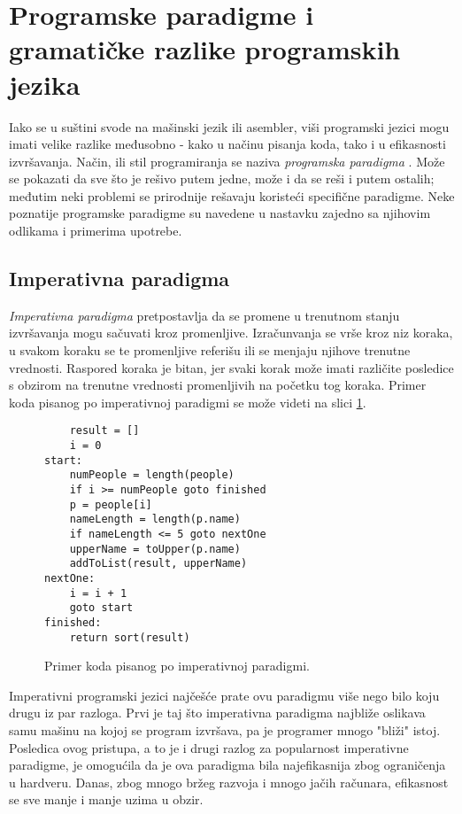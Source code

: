 \section{Programske paradigme i gramatičke razlike programskih jezika}
\label{sec:Paradigms}

Iako se u suštini svode na mašinski jezik ili asembler, viši programski jezici mogu imati velike razlike međusobno - kako u načinu pisanja koda, tako i u efikasnosti izvršavanja. Način, ili stil programiranja se naziva \emph{programska paradigma} \cite{ProgrammingParadigms}. Može se pokazati da sve što je rešivo putem jedne, može i da se reši i putem ostalih; međutim neki problemi se prirodnije rešavaju koristeći specifične paradigme. Neke poznatije programske paradigme su navedene u nastavku zajedno sa njihovim odlikama i primerima upotrebe.

\subsection{Imperativna paradigma}
\label{subsec:ParadigmImperative}

\emph{Imperativna paradigma} pretpostavlja da se promene u trenutnom stanju izvršavanja mogu sačuvati kroz promenljive. Izračunvanja se vrše kroz niz koraka, u svakom koraku se te promenljive referišu ili se menjaju njihove trenutne vrednosti. Raspored koraka je bitan, jer svaki korak može imati različite posledice s obzirom na trenutne vrednosti promenljivih na početku tog koraka. Primer koda pisanog po imperativnoj paradigmi se može videti na slici \ref{fig:ParadigmImperative}.

\begin{figure}[h!]
\begin{lstlisting}
    result = []
    i = 0
start:
    numPeople = length(people)
    if i >= numPeople goto finished
    p = people[i]
    nameLength = length(p.name)
    if nameLength <= 5 goto nextOne
    upperName = toUpper(p.name)
    addToList(result, upperName)
nextOne:
    i = i + 1
    goto start
finished:
    return sort(result)
\end{lstlisting}
\caption{Primer koda pisanog po imperativnoj paradigmi.}
\label{fig:ParadigmImperative}
\end{figure}

Imperativni programski jezici najčešće prate ovu paradigmu više nego bilo koju drugu iz par razloga. Prvi je taj što imperativna paradigma najbliže oslikava samu mašinu na kojoj se program izvršava, pa je programer mnogo "bliži" istoj. Posledica ovog pristupa, a to je i drugi razlog za popularnost imperativne paradigme, je omogućila da je ova paradigma bila najefikasnija zbog ograničenja u hardveru. Danas, zbog mnogo bržeg razvoja i mnogo jačih računara, efikasnost se sve manje i manje uzima u obzir.

